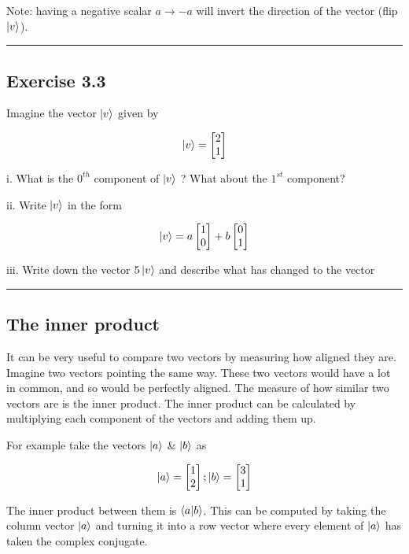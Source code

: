 \documentclass{book}
\begin{document}
Note: having a negative scalar $ a \rightarrow -a $ will invert the direction of the vector (flip $\ket{v}$). 
\hrule
\subsection{Exercise 3.3}

Imagine the vector $\ket{v}$ given by 

$$\ket{v} = \begin{bmatrix} 2 \\ 1 \end{bmatrix}$$

i. What is the $0^{th}$ component of $\ket{v}$ ? What about the $1^{st}$ component?

ii. Write $\ket{v}$ in the form 

$$
\ket{v} = a\begin{bmatrix} 1 \\ 0 \end{bmatrix} + b \begin{bmatrix} 0 \\ 1 \end{bmatrix}
$$

iii. Write down the vector $5\ket{v}$ and describe what has changed to the vector  

\hrule
\subsection{The inner product}

It can be very useful to compare two vectors by measuring how aligned they are. Imagine two vectors pointing the same way. These two vectors would have a lot in common, and so would be perfectly aligned. The measure of how similar two vectors are is the inner product. The inner product can be calculated by multiplying each component of the vectors and adding them up. 

For example take the vectors $\ket{a}$ \& $\ket{b}$ as 

 $$
 \ket{a} = \begin{bmatrix} 1 \\ 2 \end{bmatrix} ;  \ket{b} = \begin{bmatrix} 3 \\ 1 \end{bmatrix} 
 $$

 The inner product between them is $\braket{a|b}$. This can be computed by taking the column vector $\ket{a}$ and turning it into a row vector where every element of $\ket{a}$ has taken the complex conjugate. 
\end{document}
